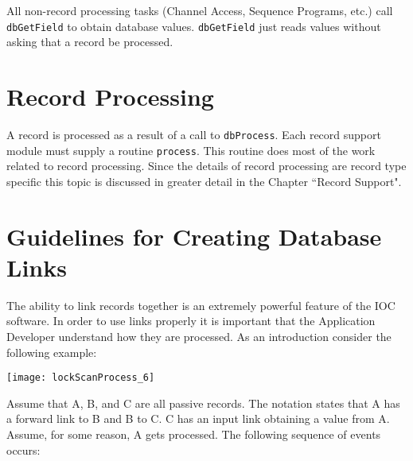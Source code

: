 All non-record processing tasks (Channel Access, Sequence Programs, etc.) call \verb|dbGetField| to obtain database values.
\verb|dbGetField| just reads values without asking that a record be processed.

\section{Record Processing}

A record is processed as a result of a call to \verb|dbProcess|.
Each record support module must supply a routine \verb|process|.
This routine does most of the work related to record processing.
Since the details of record processing are record type specific this topic is discussed in greater detail in the Chapter ``Record Support".

\section{Guidelines for Creating Database Links}

The ability to link records together is an extremely powerful feature of the IOC software.
In order to use links properly it is important that the Application Developer understand how they are processed.
As an introduction consider the following example:

\begin{center}
\texttt{[image: lockScanProcess\_6]}
\end{center}

Assume that A, B, and C are all passive records.
The notation states that A has a forward link to B and B to C.
C has an input link obtaining a value from A.
Assume, for some reason, A gets processed.
The following sequence of events occurs:

